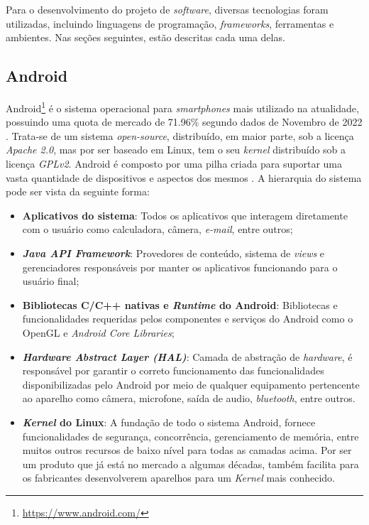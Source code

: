 Para o desenvolvimento do projeto de \textit{software}, diversas tecnologias foram utilizadas, incluindo linguagens de programação, \textit{frameworks}, ferramentas e ambientes. Nas seções seguintes, estão descritas cada uma delas.

\subsection{Android}

Android\footnote{\url{https://www.android.com/}} é o sistema operacional para \textit{smartphones} mais utilizado na atualidade, possuindo uma quota de mercado de 71.96\% segundo dados de Novembro de 2022 \cite{mobile-os}. Trata-se de um sistema \textit{open-source}, distribuído, em maior parte, sob a licença \textit{Apache 2.0}, mas por ser baseado em Linux, tem o seu \textit{kernel} distribuído sob a licença \textit{GPLv2}. Android é composto por uma pilha criada para suportar uma vasta quantidade de dispositivos e aspectos dos mesmos \cite{android}. A hierarquia do sistema pode ser vista da seguinte forma:

\begin{itemize}
    \item \textbf{Aplicativos do sistema}: Todos os aplicativos que interagem diretamente com o usuário como calculadora, câmera, \textit{e-mail}, entre outros;
    \item \textbf{\textit{Java API Framework}}: Provedores de conteúdo, sistema de \textit{views} e gerenciadores responsáveis por manter os aplicativos funcionando para o usuário final;
    \item \textbf{Bibliotecas C/C++ nativas e \textit{Runtime} do Android}: Bibliotecas e funcionalidades requeridas pelos componentes e serviços do Android como o OpenGL e \textit{Android Core Libraries};
    \item \textbf{\textit{Hardware Abstract Layer (HAL)}}: Camada de abstração de \textit{hardware}, é responsável por garantir o correto funcionamento das funcionalidades disponibilizadas pelo Android por meio de qualquer equipamento pertencente ao aparelho como câmera, microfone, saída de audio, \textit{bluetooth}, entre outros.
    \item \textbf{\textit{Kernel} do Linux}: A fundação de todo o sistema Android, fornece funcionalidades de segurança, concorrência, gerenciamento de memória, entre muitos outros recursos de baixo nível para todas as camadas acima. Por ser um produto que já está no mercado a algumas décadas, também facilita para os fabricantes desenvolverem aparelhos para um \textit{Kernel} mais conhecido.
\end{itemize}

